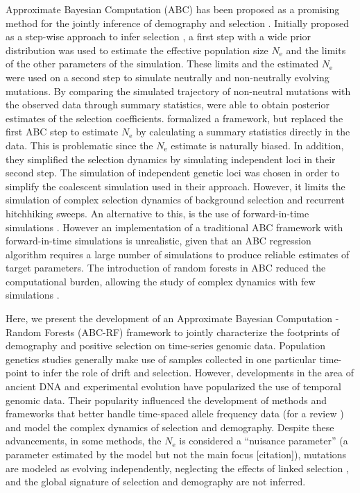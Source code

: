 \documentclass[a4paper, 12pt]{article}
\begin{document}
Approximate Bayesian Computation (ABC) has been proposed as a promising method for the jointly inference of demography and selection \citep{Li:2012bh, Johri:2019jv}. Initially proposed as a step-wise approach to infer selection \citep{Bazin:2010dv}, a first step with a wide prior distribution was used to estimate the effective population size $N_{\mathrm{e}}$ and the limits of the other parameters of the simulation. These limits and the estimated $N_{\mathrm{e}}$ were used on a second step to simulate neutrally and non-neutrally evolving mutations. By comparing the simulated trajectory of non-neutral mutations with the observed data through summary statistics, \citet{Bazin:2010dv} were able to obtain posterior estimates of the selection coefficients. \citet{Foll:2014kv, Foll:2015ce} formalized a framework, but replaced the first ABC step to estimate $N_{\mathrm{e}}$ by calculating a summary statistics directly in the data. This is problematic since the $N_{\mathrm{e}}$ estimate is naturally biased. In addition, they simplified the selection dynamics by simulating independent loci in their second step. The simulation of independent genetic loci was chosen in order to simplify the coalescent simulation used in their approach. However, it limits the simulation of complex selection dynamics of background selection and recurrent hitchhiking sweeps. An alternative to this, is the use of forward-in-time simulations \citep{Haller:2017gm}. However an implementation of a traditional ABC framework with forward-in-time simulations is unrealistic, given that an ABC regression algorithm requires a large number of simulations to produce reliable estimates of target parameters. The introduction of random forests in ABC reduced the computational burden, allowing the study of complex dynamics with few simulations \citep{Pudlo:2016il, Raynal:2017wm}.

Here, we present the development of an Approximate Bayesian Computation - Random Forests (ABC-RF) framework to jointly characterize the footprints of demography and positive selection on time-series genomic data. Population genetics studies generally make use of samples collected in one particular time-point to infer the role of drift and selection. However, developments in the area of ancient DNA \citep{Racimo:2016ea} and experimental evolution \citep{Barghi:2019gw,Kofler:2014if} have popularized the use of temporal genomic data. Their popularity influenced the development of methods and frameworks that better handle time-spaced allele frequency data (for a review \citet{Malaspinas:2015do}) and model the complex dynamics of selection and demography\citep{Malaspinas:2015do, FerrerAdmetlla:2016jc,Schraiber:2016ks}. Despite these advancements, in some methods, the $N_{\mathrm{e}}$ is considered a ``nuisance parameter'' (a parameter estimated by the model but not the main focus [citation]), mutations are modeled as evolving independently, neglecting the effects of linked selection \citep{Bollback:2008br, Malaspinas:2012dv,Feder:2014fe,Schraiber:2016ks, FerrerAdmetlla:2016jc}, and the global signature of selection and demography are not inferred.
\end{document}
